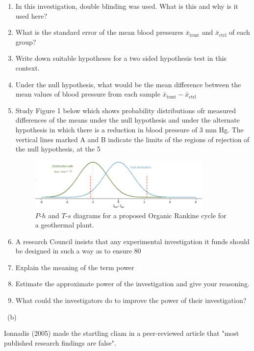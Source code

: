 \documentclass[a4paper,12pt,fleqn]{article}
\begin{document}
\begin{enumerate}
\item In this investigation, double blinding was used. What is this and why is it used here?
\item What is the standard error of the mean blood pressures $\bar{x}_\text{trmt}$ and $\bar{x}_\text{ctrl}$ of each group?
\item Write down suitable hypotheses for a two sided hypothesis test in this context.
\item Under the null hypothesis, what would be the mean difference between the mean values of blood pressure from each sample $\bar{x}_\text{trmt}-\bar{x}_\text{ctrl}$
\item  Study Figure 1 below which shows probability distributions ofr measured differences of the means under the null hypothesis and under the alternate hypothesis in which there is a reduction in blood pressure of 3 mm Hg. The vertical lines marked A and B indicate the limits of the regions of rejection of the null hypothesis, at the 5%

\begin{figure}[h]
\centering
\includegraphics[width=0.85\textwidth]{power_null_C_0_1_7_with_alt_at_3.png}
\caption{$P$-$h$ and $T$-$s$ diagrams for a proposed Organic Rankine cycle for a geothermal plant.}
\label{figure:q3b}
\end{figure}

\item A research Council insists that any experimental investigation it funds should be designed in such a way as to ensure 80%
\item Explain the meaning of the term power
\item  Estimate the approximate power of the investigation and give your reasoning.
\item What could the investigators do to improve the power of their investigation?
\end{enumerate}


\ (b)


Ionnadis (2005) made the startling cliam in a peer-reviewed article that "most published research findings are false". 
\end{document}

